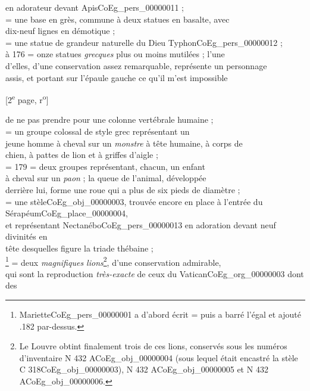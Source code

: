 \documentclass{book}
\begin{document}
en adorateur devant Apis\gls{CoEg_pers_00000011} ;\\
 = une base en grès, commune à deux statues en basalte, avec\\
dix-neuf lignes en démotique ;\\
 = une statue de grandeur naturelle du Dieu Typhon\gls{CoEg_pers_00000012} ;\\
 à 176 = onze statues \textit{grecques} plus ou moins mutilées ; l’une\\
d’elles, d’une conservation assez remarquable, représente un personnage\\
assis, et portant sur l’épaule gauche ce qu’il m’est impossible
{\footnotesize \begin{center} {[2\textsuperscript{e} page, r\textsuperscript{o}]}\end{center}}
\noindent de ne pas prendre pour une colonne vertébrale humaine ;\\
 = un groupe colossal de style grec représentant un\\
jeune homme à cheval sur un \textit{monstre} à tête humaine, à corps de\\
chien, à pattes de lion et à griffes d’aigle ;\\
 = 179 = deux groupes représentant, chacun, un enfant\\
à cheval sur un \textit{paon} ; la queue de l’animal, développée\\
derrière lui, forme une roue qui a plus de six pieds de diamètre ;\\
 = une stèle\gls{CoEg_obj_00000003}, trouvée encore en place à l’entrée du Sérapéum\gls{CoEg_place_00000004},\\
et représentant Nectanébo\gls{CoEg_pers_00000013} en adoration devant neuf divinités en\\
tête desquelles figure la triade thébaine ;\\
 \footnote{Mariette\gls{CoEg_pers_00000001} a d’abord écrit  = \fg puis a barré l’égal et ajouté \og .182 \fg par-dessus.} = deux \textit{magnifiques lions}\footnote{Le Louvre obtint finalement trois de ces lions, conservés sous les numéros d'inventaire N 432 A\gls{CoEg_obj_00000004} (sous lequel était encastré la stèle C 318\gls{CoEg_obj_00000003}), N 432 A\gls{CoEg_obj_00000005} et N 432 A\gls{CoEg_obj_00000006}.}, d’une conservation admirable,\\
qui sont la reproduction \textit{très-exacte} de ceux du Vatican\gls{CoEg_org_00000003} dont des\\
\end{document}
